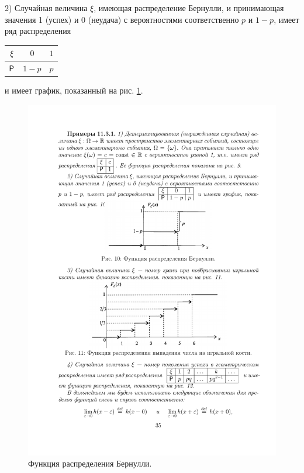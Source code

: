 2) Случайная величина $\xi$, имеющая распределение Бернулли, и принимающая значения 1 (успех) и 0 (неудача) с вероятностями соответственно
$p$ и $1 − p$, имеет ряд распределения 
\begin{tabular}{|c|c|c|}
\hline
$\xi$ & $0$ & $1$\\ \hline
$\P$   & $1-p$ & $p$\\ \hline
\end{tabular}
 и имеет график, показанный на рис. \ref{fig10}.



\begin{figure}[h!]
	\centering
	\includegraphics[]{pic/pic10}
	\caption{Функция распределения Бернулли.}
	\label{fig10}
\end{figure}

